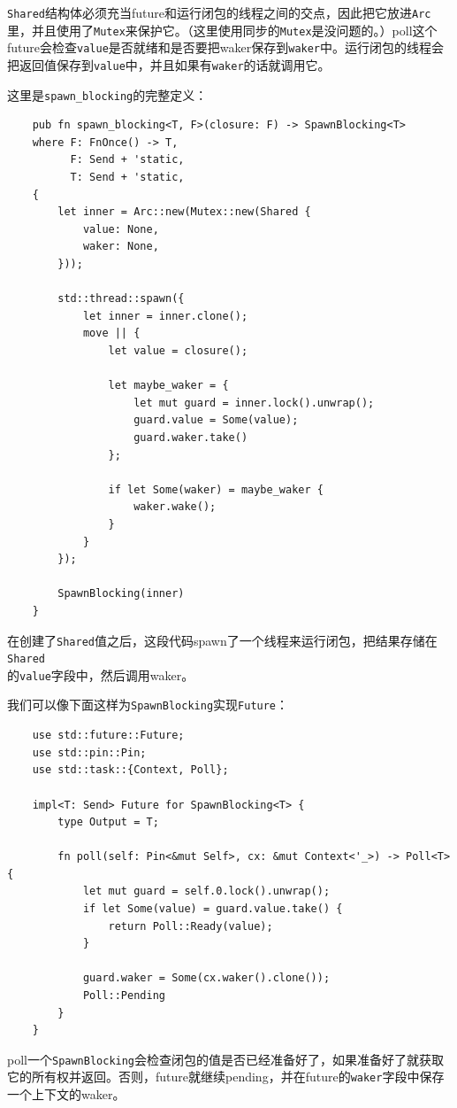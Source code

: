 \texttt{Shared}结构体必须充当future和运行闭包的线程之间的交点，因此把它放进\texttt{Arc}里，并且使用了\texttt{Mutex}来保护它。（这里使用同步的\texttt{Mutex}是没问题的。）poll这个future会检查\texttt{value}是否就绪和是否要把waker保存到\texttt{waker}中。运行闭包的线程会把返回值保存到\texttt{value}中，并且如果有\texttt{waker}的话就调用它。

这里是\texttt{spawn\_blocking}的完整定义：
\begin{verbatim}
    pub fn spawn_blocking<T, F>(closure: F) -> SpawnBlocking<T>
    where F: FnOnce() -> T,
          F: Send + 'static,
          T: Send + 'static,
    {
        let inner = Arc::new(Mutex::new(Shared {
            value: None,
            waker: None,
        }));
        
        std::thread::spawn({
            let inner = inner.clone();
            move || {
                let value = closure();

                let maybe_waker = {
                    let mut guard = inner.lock().unwrap();
                    guard.value = Some(value);
                    guard.waker.take()
                };

                if let Some(waker) = maybe_waker {
                    waker.wake();
                }
            }
        });

        SpawnBlocking(inner)
    }
\end{verbatim}

在创建了\texttt{Shared}值之后，这段代码spawn了一个线程来运行闭包，把结果存储在\texttt{Shared}\\
的\texttt{value}字段中，然后调用waker。

我们可以像下面这样为\texttt{SpawnBlocking}实现\texttt{Future}：
\begin{verbatim}
    use std::future::Future;
    use std::pin::Pin;
    use std::task::{Context, Poll};

    impl<T: Send> Future for SpawnBlocking<T> {
        type Output = T;

        fn poll(self: Pin<&mut Self>, cx: &mut Context<'_>) -> Poll<T> {
            let mut guard = self.0.lock().unwrap();
            if let Some(value) = guard.value.take() {
                return Poll::Ready(value);
            }

            guard.waker = Some(cx.waker().clone());
            Poll::Pending
        }
    }
\end{verbatim}

poll一个\texttt{SpawnBlocking}会检查闭包的值是否已经准备好了，如果准备好了就获取它的所有权并返回。否则，future就继续pending，并在future的\texttt{waker}字段中保存一个上下文的waker。

